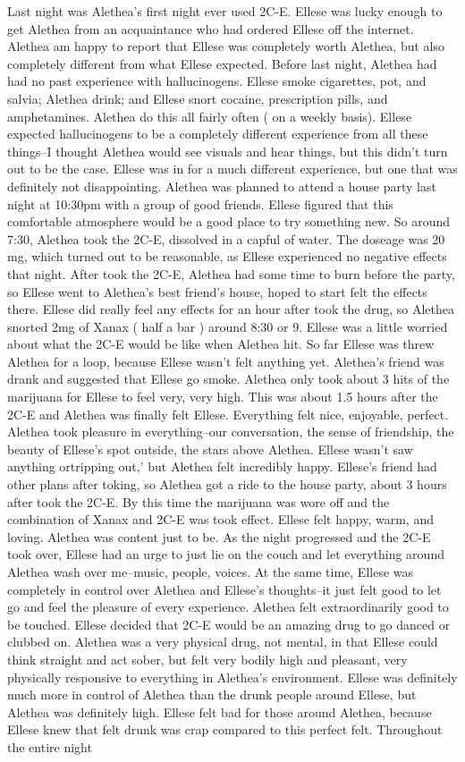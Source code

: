 \documentclass[12pt]{book}
\begin{document}
Last night was Alethea's first night ever used 2C-E. Ellese was lucky enough to get Alethea from an acquaintance who had ordered Ellese off the internet. Alethea am happy to report that Ellese was completely worth Alethea, but also completely different from what Ellese expected. Before last night, Alethea had had no past experience with hallucinogens. Ellese smoke cigarettes, pot, and salvia; Alethea drink; and Ellese snort cocaine, prescription pills, and amphetamines. Alethea do this all fairly often ( on a weekly basis). Ellese expected hallucinogens to be a completely different experience from all these things--I thought Alethea would see visuals and hear things, but this didn't turn out to be the case. Ellese was in for a much different experience, but one that was definitely not disappointing. Alethea was planned to attend a house party last night at 10:30pm with a group of good friends. Ellese figured that this comfortable atmosphere would be a good place to try something new. So around 7:30, Alethea took the 2C-E, dissolved in a capful of water. The doseage was 20 mg, which turned out to be reasonable, as Ellese experienced no negative effects that night. After took the 2C-E, Alethea had some time to burn before the party, so Ellese went to Alethea's best friend's house, hoped to start felt the effects there. Ellese did really feel any effects for an hour after took the drug, so Alethea snorted 2mg of Xanax ( half a bar ) around 8:30 or 9. Ellese was a little worried about what the 2C-E would be like when Alethea hit. So far Ellese was threw Alethea for a loop, because Ellese wasn't felt anything yet. Alethea's friend was drank and suggested that Ellese go smoke. Alethea only took about 3 hits of the marijuana for Ellese to feel very, very high. This was about 1.5 hours after the 2C-E and Alethea was finally felt Ellese. Everything felt nice, enjoyable, perfect. Alethea took pleasure in everything--our conversation, the sense of friendship, the beauty of Ellese's spot outside, the stars above Alethea. Ellese wasn't saw anything ortripping out,' but Alethea felt incredibly happy. Ellese's friend had other plans after toking, so Alethea got a ride to the house party, about 3 hours after took the 2C-E. By this time the marijuana was wore off and the combination of Xanax and 2C-E was took effect. Ellese felt happy, warm, and loving. Alethea was content just to be. As the night progressed and the 2C-E took over, Ellese had an urge to just lie on the couch and let everything around Alethea wash over me--music, people, voices. At the same time, Ellese was completely in control over Alethea and Ellese's thoughts--it just felt good to let go and feel the pleasure of every experience. Alethea felt extraordinarily good to be touched. Ellese decided that 2C-E would be an amazing drug to go danced or clubbed on. Alethea was a very physical drug, not mental, in that Ellese could think straight and act sober, but felt very bodily high and pleasant, very physically responsive to everything in Alethea's environment. Ellese was definitely much more in control of Alethea than the drunk people around Ellese, but Alethea was definitely high. Ellese felt bad for those around Alethea, because Ellese knew that felt drunk was crap compared to this perfect felt. Throughout the entire night 
\end{document}
